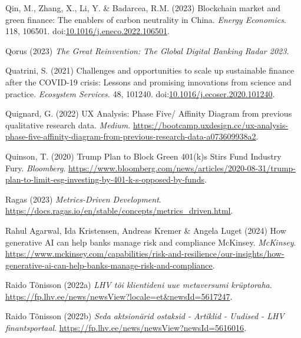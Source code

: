 \documentclass[
  letterpaper,
  DIV=11,
  numbers=noendperiod]{scrartcl}
\newlength{\cslhangindent}
\newenvironment{CSLReferences}[2] %
 {\begin{list}{}{%
  \setlength{\itemindent}{0pt}
  \setlength{\leftmargin}{0pt}
  \setlength{\parsep}{0pt}
  \ifodd #1
   \setlength{\leftmargin}{\cslhangindent}
   \setlength{\itemindent}{-1\cslhangindent}
  \fi
  \setlength{\itemsep}{#2\baselineskip}}}
 {\end{list}}
\begin{document}
\begin{CSLReferences}{0}{1}
Qin, M., Zhang, X., Li, Y. \& Badarcea, R.M. (2023) Blockchain market
and green finance: {The} enablers of carbon neutrality in {China}.
\emph{Energy Economics}. 118, 106501.
doi:\href{https://doi.org/10.1016/j.eneco.2022.106501}{10.1016/j.eneco.2022.106501}.

Qorus (2023) \emph{The {Great Reinvention}: {The Global Digital Banking
Radar} 2023}.

Quatrini, S. (2021) Challenges and opportunities to scale up sustainable
finance after the {COVID-19} crisis: {Lessons} and promising innovations
from science and practice. \emph{Ecosystem Services}. 48, 101240.
doi:\href{https://doi.org/10.1016/j.ecoser.2020.101240}{10.1016/j.ecoser.2020.101240}.

Quignard, G. (2022) {UX Analysis}: {Phase Five}/ {Affinity Diagram} from
previous qualitative research data. \emph{Medium}.
\url{https://bootcamp.uxdesign.cc/ux-analysis-phase-five-affinity-diagram-from-previous-research-data-a073609938a2}.

Quinson, T. (2020) Trump {Plan} to {Block Green} 401(k)s {Stirs Fund
Industry Fury}. \emph{Bloomberg}.
\url{https://www.bloomberg.com/news/articles/2020-08-31/trump-plan-to-limit-esg-investing-by-401-k-s-opposed-by-funds}.

Ragas (2023) \emph{Metrics-{Driven Development}}.
\url{https://docs.ragas.io/en/stable/concepts/metrics_driven.html}.

Rahul Agarwal, Ida Kristensen, Andreas Kremer \& Angela Luget (2024) How
generative {AI} can help banks manage risk and compliance {\textbar}
{McKinsey}. \emph{McKinsey}.
\url{https://www.mckinsey.com/capabilities/risk-and-resilience/our-insights/how-generative-ai-can-help-banks-manage-risk-and-compliance}.

Raido Tõnisson (2022a) \emph{{LHV} t{õ}i klientideni uue metaversumi
kr{ü}ptoraha}.
\url{https://fp.lhv.ee/news/newsView?locale=et&newsId=5617247}.

Raido Tõnisson (2022b) \emph{Seda aktsion{ä}rid ostaksid - {Artiklid} -
{Uudised} - {LHV} finantsportaal}.
\url{https://fp.lhv.ee/news/newsView?newsId=5616016}.


\end{CSLReferences}
\end{document}

